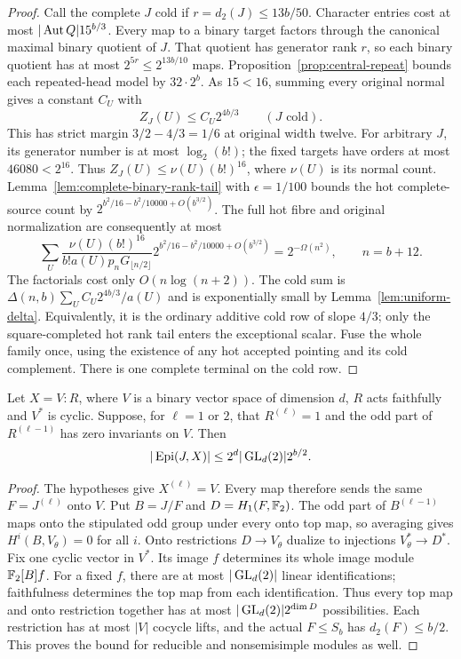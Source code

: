\begin{proof}
Call the complete $J$ cold if $r=d_2(J)\leq13b/50$.
Character entries cost at most $|\operatorname{Aut} Q|15^{b/3}$.
Every map to a binary target factors through the canonical maximal
binary quotient of $J$. That quotient has generator rank $r$,
so each binary quotient has at most $2^{5r}\leq2^{13b/10}$ maps.
Proposition~\ref{prop:central-repeat} bounds each repeated-head
model by $32\cdot2^b$. As $15<16$, summing every original normal
gives a constant $C_U$ with
\[
 Z_J(U)\leq C_U2^{4b/3}\qquad(J\text{ cold}).
\]
This has strict margin $3/2-4/3=1/6$ at original width twelve.
For arbitrary $J$, its generator number is at most $\log_2(b!)$;
the fixed targets have orders at most $46080<2^{16}$. Thus
$Z_J(U)\leq\nu(U)(b!)^{16}$, where $\nu(U)$ is its normal count.
Lemma~\ref{lem:complete-binary-rank-tail} with $\epsilon=1/100$
bounds the hot complete-source count by
$2^{b^2/16-b^2/10000+O(b^{3/2})}$.
The full hot fibre and original normalization are consequently at
most
\[
 \sum_U\frac{\nu(U)(b!)^{16}}{b!a(U)p_nG_{\lfloor n/2\rfloor}}
 2^{b^2/16-b^2/10000+O(b^{3/2})}
 =2^{-\Omega(n^2)},\qquad n=b+12.
\]
The factorials cost only $O(n\log(n+2))$. The cold sum is
$\Delta(n,b)\sum_U C_U2^{4b/3}/a(U)$ and is exponentially small
by Lemma~\ref{lem:uniform-delta}. Equivalently, it is the ordinary
additive cold row of slope $4/3$; only the square-completed hot rank
tail enters the exceptional scalar. Fuse the whole family once,
using the existence of any hot accepted pointing and its cold
complement. There is one complete terminal on the cold row.
\end{proof}

\begin{lemma}
\label{lem:binary-cyclic-dual}
Let $X=V:R$, where $V$ is a binary vector space of dimension $d$,
$R$ acts faithfully and $V^*$ is cyclic. Suppose, for $\ell=1$ or
$2$, that $R^{(\ell)}=1$ and the odd part of $R^{(\ell-1)}$ has
zero invariants on $V$. Then
\[
 |\operatorname{Epi}(J,X)|\leq2^d|\operatorname{GL}_d(2)|2^{b/2}.
\]
\end{lemma}
\begin{proof}
The hypotheses give $X^{(\ell)}=V$. Every map therefore sends the
same $F=J^{(\ell)}$ onto $V$. Put $B=J/F$ and $D=H_1(F,\mathbb F_2)$.
The odd part of $B^{(\ell-1)}$ maps onto the stipulated odd group
under every onto top map, so averaging gives $H^i(B,V_\theta)=0$
for all $i$. Onto restrictions $D\to V_\theta$ dualize to
injections $V_\theta^*\to D^*$. Fix one cyclic vector in $V^*$.
Its image $f$ determines its whole image module $\mathbb F_2[B]f$.
For a fixed $f$, there are at most $|\operatorname{GL}_d(2)|$ linear
identifications; faithfulness determines the top map from each
identification. Thus every top map and onto restriction together
has at most $|\operatorname{GL}_d(2)|2^{\dim D}$ possibilities. Each restriction
has at most $|V|$ cocycle lifts, and the actual $F\leq S_b$ has
$d_2(F)\leq b/2$. This proves the bound for reducible and
nonsemisimple modules as well.
\end{proof}

